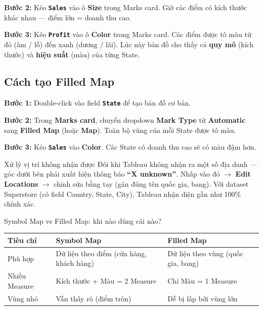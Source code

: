 \documentclass[12pt]{article}
\begin{document}
\noindent \textbf{Bước 2:} Kéo \textbf{\texttt{Sales}} vào ô \textbf{Size} trong Marks card. Giờ các điểm có kích thước khác nhau --- điểm lớn = doanh thu cao.

\noindent \textbf{Bước 3:} Kéo \textbf{\texttt{Profit}} vào ô \textbf{Color} trong Marks card. Các điểm được tô màu từ đỏ (âm / lỗ) đến xanh (dương / lãi). Lúc này bản đồ cho thấy cả \textbf{quy mô} (kích thước) và \textbf{hiệu suất} (màu) của từng State.

\subsection{Cách tạo Filled Map}

\noindent \textbf{Bước 1:} Double-click vào field \textbf{\texttt{State}} để tạo bản đồ cơ bản.

\noindent \textbf{Bước 2:} Trong \textbf{Marks card}, chuyển dropdown \textbf{Mark Type} từ \textbf{Automatic} sang \textbf{Filled Map} (hoặc \textbf{Map}). Toàn bộ vùng của mỗi State được tô màu.

\noindent \textbf{Bước 3:} Kéo \textbf{\texttt{Sales}} vào \textbf{Color}. Các State có doanh thu cao sẽ có màu đậm hơn.

\begin{warningbox}{Xử lý vị trí không nhận được}
Đôi khi Tableau không nhận ra một số địa danh --- góc dưới bên phải xuất hiện thông báo \textbf{``X unknown''}. Nhấp vào đó $\rightarrow$ \textbf{Edit Locations} $\rightarrow$ chỉnh sửa bằng tay (gán đúng tên quốc gia, bang). Với dataset Superstore (có field Country, State, City), Tableau nhận diện gần như 100\% chính xác.
\end{warningbox}

\begin{tipbox}{Symbol Map vs Filled Map: khi nào dùng cái nào?}
\renewcommand{\arraystretch}{1.3}
\begin{tabularx}{\linewidth}{l X X}
\toprule
\textbf{Tiêu chí} & \textbf{Symbol Map} & \textbf{Filled Map} \\
\midrule
Phù hợp & Dữ liệu theo điểm (cửa hàng, khách hàng) & Dữ liệu theo vùng (quốc gia, bang) \\
Nhiều Measure & Kích thước + Màu = 2 Measure & Chỉ Màu = 1 Measure \\
Vùng nhỏ & Vẫn thấy rõ (điểm tròn) & Dễ bị lấp bởi vùng lớn \\
\bottomrule
\end{tabularx}
\end{tipbox}
\end{document}
